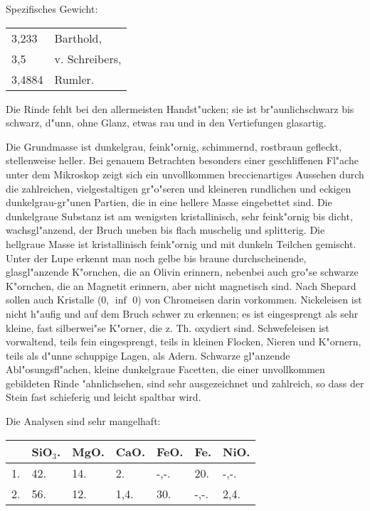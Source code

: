 \documentclass[a4paper, 11pt, oneside]{article}
\begin{document}
Spezifisches Gewicht:
\begin{table}[!ht]
    \centering
    \begin{tabular}{l l}
        3,233 & Barthold,\\
        3,5 & v. Schreibers,\\
        3,4884 & Rumler.
    \end{tabular}
\end{table}

Die Rinde fehlt bei den allermeisten Handst"ucken; sie ist br"aunlichschwarz bis schwarz, d"unn, ohne Glanz, etwas rau und in den Vertiefungen glasartig.

Die Grundmasse ist dunkelgrau, feink"ornig, schimmernd, rostbraun gefleckt, stellenweise heller. Bei genauem Betrachten besonders einer geschliffenen Fl"ache unter dem Mikroskop zeigt sich ein unvollkommen breccienartiges Aussehen durch die zahlreichen, vielgestaltigen gr"o"seren und kleineren rundlichen und eckigen dunkelgrau-gr"unen Partien, die in eine hellere Masse eingebettet sind. Die dunkelgraue Substanz ist am wenigsten kristallinisch, sehr feink"ornig bis dicht, wachsgl"anzend, der Bruch uneben bis flach muschelig und splitterig. Die hellgraue Masse ist kristallinisch feink"ornig und mit dunkeln Teilchen gemischt. Unter der Lupe erkennt man noch gelbe bis braune durchscheinende, glasgl"anzende K"ornchen, die an Olivin erinnern, nebenbei auch gro"se schwarze K"ornchen, die an Magnetit erinnern, aber nicht magnetisch sind. Nach Shepard sollen auch Kristalle (0, $\inf$ 0) von Chromeisen darin vorkommen. Nickeleisen ist nicht h"aufig und auf dem Bruch schwer zu erkennen; es ist eingesprengt als sehr kleine, fast silberwei"se K"orner, die z. Th. oxydiert sind. Schwefeleisen ist vorwaltend, teils fein eingesprengt, teils in kleinen Flocken, Nieren und K"ornern, teils als d"unne schuppige Lagen, als Adern. Schwarze gl"anzende Abl"osungsfl"achen, kleine dunkelgraue Facetten, die einer unvollkommen gebildeten Rinde "ahnlichsehen, sind sehr ausgezeichnet und zahlreich, so dass der Stein fast schieferig und leicht spaltbar wird.

Die Analysen sind sehr mangelhaft:
\begin{table}[!ht]
    \centering
    \begin{tabular}{l l l l l l l}
         & SiO$_{3}$. & MgO. & CaO. & FeO. & Fe. & NiO.\\ \hline
        1. & 42. & 14. & 2. & -,-. & 20. & -,-. \\
        2. & 56. & 12. & 1,4. & 30. & -,-. & 2,4. \\
    \end{tabular}
\end{table}
\end{document}
